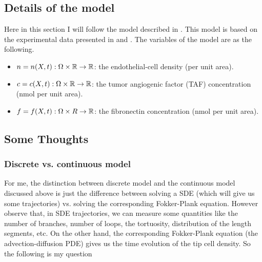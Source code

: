 \subsection{Details of the model}
Here in this section I will follow the model described in \cite{Anderson1998}. This model is based on the experimental data presented in \cite{Gimbrone1974} and \cite{Muthukkaruppan1982}. The variables of the model are as the following.

\begin{itemize}
	\item $ n = n(X,t): \Omega \times \mathbb{R} \to \mathbb{R} $: the endothelial-cell density (per unit area).
	\item $ c = c(X,t): \Omega \times \mathbb{R} \to \mathbb{R} $: the tumor angiogenic factor (TAF) concentration (nmol per unit area).
	\item $ f = f(X,t): \Omega \times R \to \mathbb{R} $: the fibronectin concentration (nmol per unit area).
\end{itemize}



\subsection{Some Thoughts}
\subsubsection{Discrete vs. continuous model}
For me, the distinction between discrete model and the continuous model discussed above is just the difference between solving a SDE (which will give us some trajectories) vs. solving the corresponding Fokker-Plank equation. However observe that, in SDE trajectories, we can measure some quantities like the number of branches, number of loops, the tortuosity, distribution of the length segments, etc. On the other hand, the corresponding Fokker-Plank equation (the advection-diffusion PDE) gives us the time evolution of the tip cell density. So the following is my question

